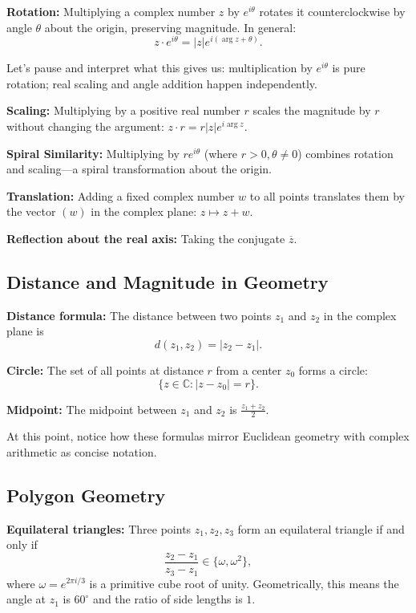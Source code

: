 \documentclass[12pt]{extarticle}
\begin{document}
\textbf{Rotation:} Multiplying a complex number $z$ by $e^{i\theta}$ rotates it counterclockwise by angle $\theta$ about the origin, preserving magnitude. In general:
\[
z \cdot e^{i\theta} = |z| e^{i(\arg z + \theta)}.
\]

Let’s pause and interpret what this gives us: multiplication by $e^{i\theta}$ is pure rotation; real scaling and angle addition happen independently.

\textbf{Scaling:} Multiplying by a positive real number $r$ scales the magnitude by $r$ without changing the argument: $z \cdot r = r|z| e^{i\arg z}$.

\textbf{Spiral Similarity:} Multiplying by $re^{i\theta}$ (where $r>0, \theta \neq 0$) combines rotation and scaling—a spiral transformation about the origin.

\textbf{Translation:} Adding a fixed complex number $w$ to all points translates them by the vector $(w)$ in the complex plane: $z \mapsto z + w$.

\textbf{Reflection about the real axis:} Taking the conjugate $\overline{z}$.

\subsection*{Distance and Magnitude in Geometry}

\textbf{Distance formula:} The distance between two points $z_1$ and $z_2$ in the complex plane is
\[
d(z_1, z_2) = |z_2 - z_1|.
\]

\textbf{Circle:} The set of all points at distance $r$ from a center $z_0$ forms a circle:
\[
\{z \in \mathbb{C} : |z - z_0| = r\}.
\]

\textbf{Midpoint:} The midpoint between $z_1$ and $z_2$ is $\tfrac{z_1 + z_2}{2}$.

At this point, notice how these formulas mirror Euclidean geometry with complex arithmetic as concise notation.

\subsection*{Polygon Geometry}

\textbf{Equilateral triangles:} Three points $z_1, z_2, z_3$ form an equilateral triangle if and only if
\[
\frac{z_2 - z_1}{z_3 - z_1} \in \{\omega, \omega^2\},
\]
where $\omega = e^{2\pi i/3}$ is a primitive cube root of unity. Geometrically, this means the angle at $z_1$ is $60^\circ$ and the ratio of side lengths is $1$.
\end{document}

